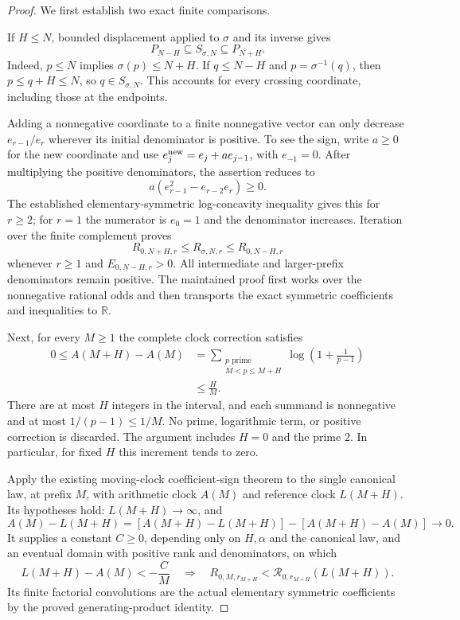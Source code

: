 \documentclass[11pt]{article}
\theoremstyle{definition}
\begin{document}
\begin{proof}
We first establish two exact finite comparisons.

If $H\le N$, bounded displacement applied to $\sigma$ and its inverse
gives
\[
 P_{N-H}\subseteq S_{\sigma,N}\subseteq P_{N+H}.
\]
Indeed, $p\le N$ implies $\sigma(p)\le N+H$.
If $q\le N-H$ and $p=\sigma^{-1}(q)$, then $p\le q+H\le N$,
so $q\in S_{\sigma,N}$. This accounts for every crossing coordinate,
including those at the endpoints.

Adding a nonnegative coordinate to a finite nonnegative vector can
only decrease $e_{r-1}/e_r$ wherever its initial denominator is positive.
To see the sign, write $a\ge0$ for the new coordinate and use
$e_j^{\rm new}=e_j+a e_{j-1}$, with $e_{-1}=0$.
After multiplying the positive denominators, the assertion reduces to
\[
 a(e_{r-1}^2-e_{r-2}e_r)\ge0.
\]
The established elementary-symmetric log-concavity inequality gives
this for $r\ge2$; for $r=1$ the numerator is $e_0=1$ and the
denominator increases. Iteration over the finite complement proves
\[
 R_{0,N+H,r}\le R_{\sigma,N,r}\le R_{0,N-H,r}
 \tag{U1}
\]
whenever $r\ge1$ and $E_{0,N-H,r}>0$.
All intermediate and larger-prefix denominators remain positive.
The maintained proof first works over the nonnegative rational odds
and then transports the exact symmetric coefficients and inequalities
to $\mathbb R$.

Next, for every $M\ge1$ the complete clock correction satisfies
\[
 \begin{split}
 0\le A(M+H)-A(M)
 &=\sum_{\substack{p\text{ prime}\\M<p\le M+H}}
       \log\left(1+\frac1{p-1}\right)\\
 &\le \frac{H}{M}.
 \end{split}
 \tag{U2}
\]
There are at most $H$ integers in the interval, and each summand is
nonnegative and at most $1/(p-1)\le1/M$.
No prime, logarithmic term, or positive correction is discarded.
The argument includes $H=0$ and the prime $2$.
In particular, for fixed $H$ this increment tends to zero.

Apply the existing moving-clock coefficient-sign theorem to the single
canonical law, at prefix $M$, with arithmetic clock $A(M)$ and reference
clock $L(M+H)$. Its hypotheses hold: $L(M+H)\to\infty$, and
\[
 A(M)-L(M+H)
 =[A(M+H)-L(M+H)]-[A(M+H)-A(M)]\longrightarrow0.
\]
It supplies a constant $C\ge0$, depending only on $H,\alpha$ and the
canonical law, and an eventual domain with positive rank and
denominators, on which
\[
 L(M+H)-A(M)<-\frac C M
 \quad\Longrightarrow\quad
 R_{0,M,r_{M+H}}<
   \mathcal R_{0,r_{M+H}}(L(M+H)).
 \tag{U3}
\]
Its finite factorial convolutions are the actual elementary symmetric
coefficients by the proved generating-product identity.


\end{proof}
\end{document}
